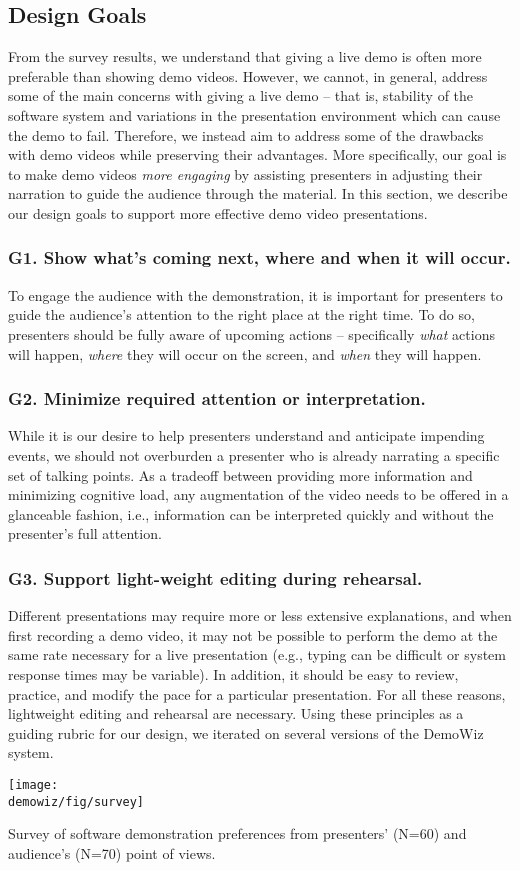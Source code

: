 \subsection{Design Goals} From the survey results, we understand that giving a live demo is often more preferable than showing demo videos. However, we cannot, in general, address some of the main concerns with giving a live demo – that is, stability of the software system and variations in the presentation environment which can cause the demo to fail. Therefore, we instead aim to address some of the drawbacks with demo videos while preserving their advantages. More specifically, our goal is to make demo videos \textit{more engaging} by assisting presenters in adjusting their narration to guide the audience through the material. In this section, we describe our design goals to support more effective demo video presentations.

\subsubsection{G1. Show what's coming next, where and when it will occur.}
To engage the audience with the demonstration, it is important for presenters to guide the audience's attention to the right place at the right time. To do so, presenters should be fully aware of upcoming actions – specifically \textit{what} actions will happen, \textit{where} they will occur on the screen, and \textit{when} they will happen.

\subsubsection{G2. Minimize required attention or interpretation.}
While it is our desire to help presenters understand and anticipate impending events, we should not overburden a presenter who is already narrating a specific set of talking points. As a tradeoff between providing more information and minimizing cognitive load, any augmentation of the video needs to be offered in a glanceable fashion, i.e., information can be interpreted quickly and without the presenter's full attention.

\subsubsection{G3. Support light-weight editing during rehearsal.}
Different presentations may require more or less extensive explanations, and when first recording a demo video, it may not be possible to perform the demo at the same rate necessary for a live presentation (e.g., typing can be difficult or system response times may be variable). In addition, it should be easy to review, practice, and modify the pace for a particular presentation. For all these reasons, lightweight editing and rehearsal are necessary.  Using these principles as a guiding rubric for our design, we iterated on several versions of the DemoWiz system.

\begin{table}
  \centering
  \texttt{[image: \\demowiz/fig/survey]}
  \caption{Survey of software demonstration preferences from presenters' (N=60) and audience's (N=70) point of views.}
  \label{tab:demowiz_survey}
\end{table}
